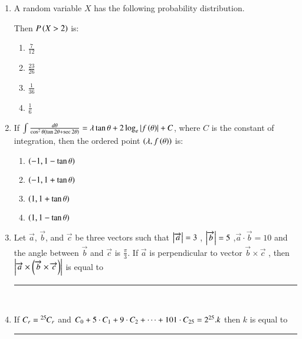 \documentclass[journal]{IEEEtran}
\begin{document}
\begin{enumerate}
\item A random variable $X$ has the following probability distribution.
    \begin{table}[h!]    
        \centering
        
    \end{table}
    Then $P\left(X>2\right)$ is:
    \begin{multicols}{2}
    \begin{enumerate}
        \item $\frac{7}{12}$\\
        \item $\frac{23}{26}$
        \item $\frac{1}{36}$\\
        \item $\frac{1}{6}$
    \end{enumerate}
    \end{multicols}

    \item If $\int \frac{d\theta}{\cos^2 \theta (\tan 2\theta + \sec 2 \theta)} = \lambda \tan \theta + 2 \log_e \left\vert f\left(\theta\right)\right\vert  + C$, where $C$ is the constant of integration, then the ordered point $\left(\lambda, f\left(\theta\right)\right)$ is:
    \begin{multicols}{2}
    \begin{enumerate}
        \item $\left(-1, 1-\tan \theta\right)$\\
        \item $\left(-1, 1+\tan \theta\right)$
        \item $\left(1, 1+\tan \theta\right)$\\
        \item $\left(1, 1-\tan \theta\right)$
    \end{enumerate}
    \end{multicols}

    \item Let $\Vec{a}$, $\vec{b}$, and $\vec{c}$ be three vectors such that $\left\vert\overrightarrow a\right\vert=3$ , $\left\vert\overrightarrow b\right\vert=5$ ,$\overrightarrow{a}\cdot \overrightarrow{b}= 10$ and the angle between $\overrightarrow{b}$ and $\overrightarrow{c}$ is $\frac{\pi}{3}$. If $\overrightarrow{a}$ is perpendicular to vector $\overrightarrow{b} \times \overrightarrow{c}$ ,  then $\left\vert\overrightarrow{a} \times \left(\overrightarrow{b}\times \overrightarrow{c}\right)\right\vert$ is equal to \rule{1cm}{0.15mm}\\

   \item If ${{}^{}\mkern-1muC_{r}} = {{}^{25}\mkern-1muC_{r}}$ and ${{}^{}\mkern-1muC_{0}}+ 5 \cdot {{}^{}\mkern-1muC_{1}}+ 9 \cdot {{}^{}\mkern-1muC_{2}}+ \dots + 101 \cdot {{}^{}\mkern-1muC_{25}} = 2^{25}. k $ then $k$ is equal to \rule{1cm}{0.15mm}\\



\end{enumerate}
\end{document}
